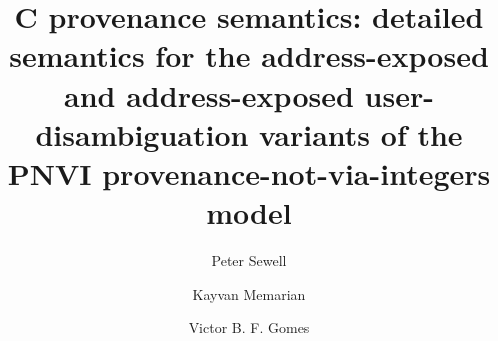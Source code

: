 \documentclass[acmsmall,review,screen]{acmart}\settopmatter{printfolios=true,printccs=false,printacmref=false}
\newif\ifWGfourteennumber
\begin{document}
\ifWGfourteennumber
\fancypagestyle{firstpagestyle}{%
\fancyhf{} %
\fancyhead[C]{ISO/IEC JTC1/SC22/WG14 N2311, 2018-11-09} %
\renewcommand{\headrulewidth}{0pt}
\renewcommand{\footrulewidth}{0pt}}
\thispagestyle{plain}
\fi

\title[PNVI-ae and PNVI-ae-udi: detailed semantics]{C provenance semantics: detailed
semantics for the
address-exposed and address-exposed 
user-disambiguation variants of the PNVI provenance-not-via-integers
model}


\authorsaddresses{}

\author{Peter Sewell}

 \author{Kayvan Memarian}
% 
% 
 \author{Victor B. F. Gomes}

\renewcommand{\shortauthors}{Sewell, Memarian, Gomes}

\end{document}
